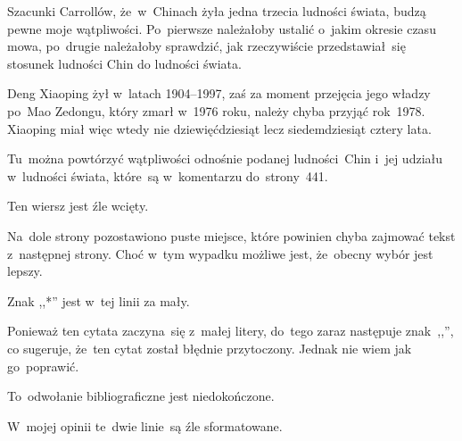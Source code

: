 \documentclass[a4paper,11pt]{article}
\begin{document}
\vspace{\spaceFour}


\start {} Szacunki Carrollów, że~w~Chinach żyła jedna
trzecia ludności świata, budzą pewne moje wątpliwości. Po~pierwsze
należałoby ustalić o~jakim okresie czasu mowa, po~drugie należałoby
sprawdzić, jak rzeczywiście przedstawiał~się stosunek ludności Chin do
ludności świata.

\vspace{\spaceFour}


\start {} Deng Xiaoping żył w~latach 1904--1997, zaś za
moment przejęcia jego władzy po~Mao Zedongu, który zmarł w~1976 roku,
należy chyba przyjąć rok~1978. Xiaoping miał więc wtedy nie
dziewięćdziesiąt lecz siedemdziesiąt cztery lata.

\vspace{\spaceFour}


\start {} Tu~można powtórzyć wątpliwości odnośnie podanej
ludności~Chin i~jej udziału w~ludności świata, które~są w~komentarzu
do~strony~441.

\vspace{\spaceFour}


\start {} Ten wiersz jest źle wcięty.

\vspace{\spaceFour}


\start {} Na~dole strony pozostawiono puste miejsce, które
powinien chyba zajmować tekst z~następnej strony. Choć w~tym wypadku
możliwe jest, że~obecny wybór jest lepszy.

\vspace{\spaceFour}


\start {} Znak ,,*'' jest w~tej linii za mały.

\vspace{\spaceFour}


\start {} Ponieważ ten cytata zaczyna~się z~małej litery,
do~tego zaraz następuje znak~,,\ld'', co sugeruje, że~ten cytat został
błędnie przytoczony. Jednak nie wiem jak go~poprawić.

\vspace{\spaceFour}


\start {} To~odwołanie bibliograficzne jest niedokończone.

\vspace{\spaceFour}


\start {} W~mojej opinii te~dwie linie~są źle
sformatowane.
\end{document}
